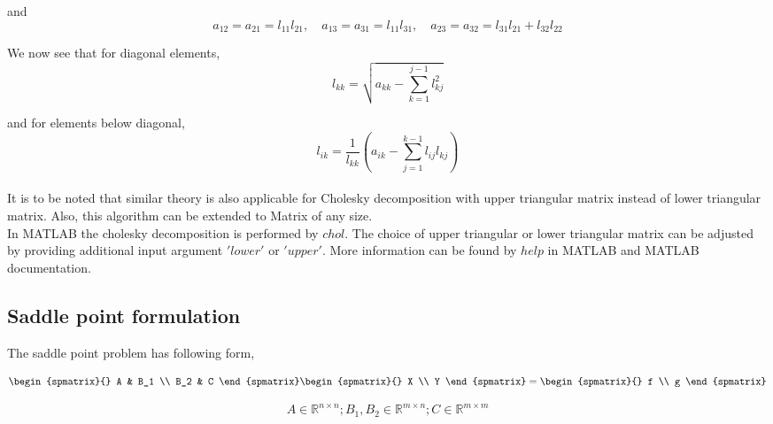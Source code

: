 \documentclass[a4paper,12pt]{book}
\begin{document}
and 
\begin{equation}
a_{12} = a_{21} = l_{11}l_{21}, \quad a_{13} = a_{31} = l_{11}l_{31}, \quad a_{23} = a_{32} = l_{31}l_{21} + l_{32}l_{22}
\end{equation}

We now see that for diagonal elements,\\

\begin{equation}
l_{kk} = \sqrt{a_{kk} - \sum_{k=1}^{j-1} l_{kj}^2}
\end{equation}

and for elements below diagonal,\\

\begin{equation}
l_{ik} = \frac{1}{l_{kk}}(a_{ik}-\sum_{j=1}^{k-1} l_{ij}l_{kj})
\end{equation}
\\
It is to be noted that similar theory is also applicable for Cholesky decomposition with upper triangular matrix instead of lower triangular matrix. Also, this algorithm can be extended to Matrix of any size. \\

In MATLAB the cholesky decomposition is performed by $chol$. The choice of upper triangular or lower triangular matrix can be adjusted by providing additional input argument $'lower'$ or $'upper'$. More information can be found by $help$ in MATLAB and MATLAB documentation.
 
\subsection{Saddle point formulation} \label{saddle_point} \cite{saddle}

The saddle point problem has following form,

\begin{equation} 
\begin{spmatrix}{}
    A & B_1 \\
    B_2 & C
\end{spmatrix}
\begin{spmatrix}{}
    X \\
    Y
\end{spmatrix}
=
\begin{spmatrix}{}
    f  \\
   	g
\end{spmatrix}
\end{equation}

\begin{equation}
A \in \mathbb{R}^{n \times n}; B_1, B_2 \in \mathbb{R}^{m \times n}; C \in \mathbb{R}^{m \times m} 
\end{equation}
\end{document}
